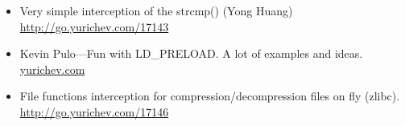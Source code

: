\begin{itemize}

\item
Very simple interception of the strcmp() (Yong Huang) 
\url{http://go.yurichev.com/17143}

\item
Kevin Pulo---Fun with LD\_PRELOAD. A lot of examples and ideas.
\href{http://go.yurichev.com/17145}{yurichev.com}

\item
File functions interception for compression/decompression files on fly (zlibc). \url{http://go.yurichev.com/17146}

\end{itemize}
